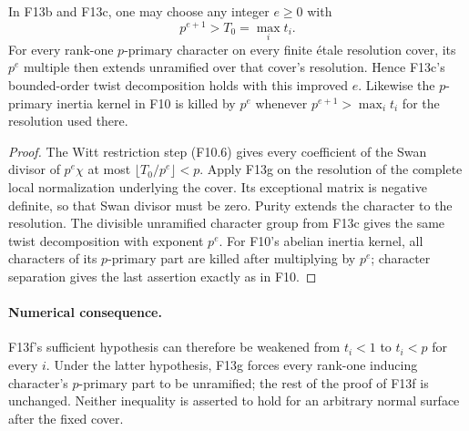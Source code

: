 \begin{corollary}
In F13b and F13c, one may choose any integer $e\geq0$ with
\[
                           p^{e+1}>T_0=\max_i t_i.
 \tag{F13.13}
\]
For every rank-one $p$-primary character on every finite \'etale
resolution cover, its $p^e$ multiple then extends unramified
over that cover's resolution. Hence F13c's bounded-order twist
decomposition holds with this improved $e$.
Likewise the $p$-primary inertia kernel in F10 is killed by
$p^e$ whenever $p^{e+1}>\max_i t_i$ for the resolution used
there.
\end{corollary}
\begin{proof}
The Witt restriction step (F10.6) gives every coefficient of the
Swan divisor of $p^e\chi$ at most
$\lfloor T_0/p^e\rfloor<p$. Apply F13g on the resolution of
the complete local normalization underlying the cover. Its
exceptional matrix is negative definite, so that Swan divisor
must be zero. Purity extends the character to the resolution.
The divisible unramified character group from F13c gives the
same twist decomposition with exponent $p^e$.
For F10's abelian inertia kernel, all characters of its
$p$-primary part are killed after multiplying by $p^e$;
character separation gives the last assertion exactly as in
F10.
\end{proof}

\paragraph{Numerical consequence.}
F13f's sufficient hypothesis can therefore be weakened from
$t_i<1$ to $t_i<p$ for every $i$. Under the latter hypothesis,
F13g forces every rank-one inducing character's $p$-primary
part to be unramified; the rest of the proof of F13f is
unchanged. Neither inequality is asserted to hold for an
arbitrary normal surface after the fixed cover.
